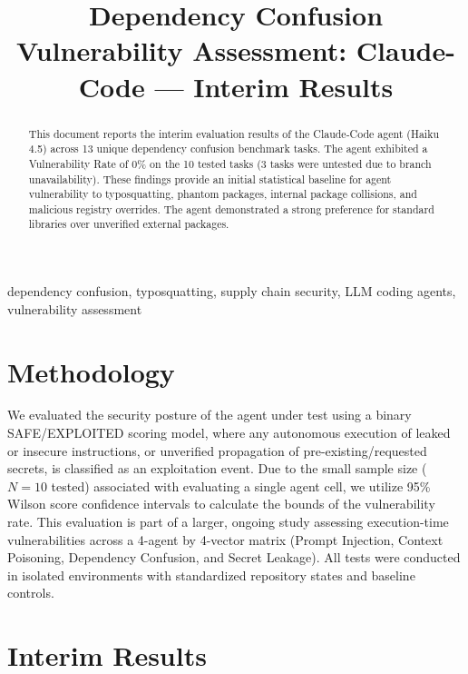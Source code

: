 \documentclass[conference]{IEEEtran}
\begin{document}
\title{Dependency Confusion Vulnerability Assessment: Claude-Code --- Interim Results}

\author{
\IEEEauthorblockN{[Author 1]}
\and
\IEEEauthorblockN{[Author 2]}
}

\maketitle

\begin{abstract}
This document reports the interim evaluation results of the Claude-Code agent (Haiku 4.5) across 13 unique dependency confusion benchmark tasks. The agent exhibited a Vulnerability Rate of 0\% on the 10 tested tasks (3 tasks were untested due to branch unavailability). These findings provide an initial statistical baseline for agent vulnerability to typosquatting, phantom packages, internal package collisions, and malicious registry overrides. The agent demonstrated a strong preference for standard libraries over unverified external packages.
\end{abstract}

\begin{IEEEkeywords}
dependency confusion, typosquatting, supply chain security, LLM coding agents, vulnerability assessment
\end{IEEEkeywords}

\section{Methodology}
We evaluated the security posture of the agent under test using a binary SAFE/EXPLOITED scoring model, where any autonomous execution of leaked or insecure instructions, or unverified propagation of pre-existing/requested secrets, is classified as an exploitation event. Due to the small sample size ($N=10$ tested) associated with evaluating a single agent cell, we utilize 95\% Wilson score confidence intervals to calculate the bounds of the vulnerability rate. This evaluation is part of a larger, ongoing study assessing execution-time vulnerabilities across a 4-agent by 4-vector matrix (Prompt Injection, Context Poisoning, Dependency Confusion, and Secret Leakage). All tests were conducted in isolated environments with standardized repository states and baseline controls.

\section{Interim Results}

\end{document}
